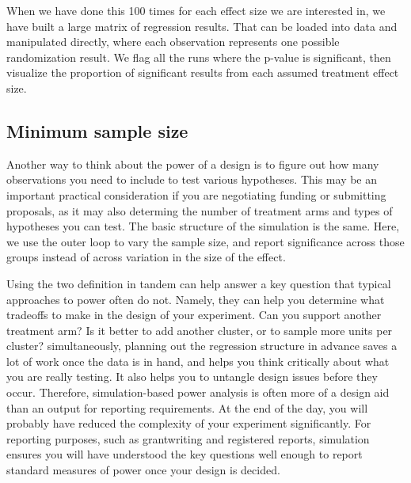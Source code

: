 When we have done this 100 times for each effect size we are interested in,
we have built a large matrix of regression results.
That can be loaded into data and manipulated directly,
where each observation represents one possible randomization result.
We flag all the runs where the p-value is significant,
then visualize the proportion of significant results
from each assumed treatment effect size.

{
}

\subsection{Minimum sample size}

Another way to think about the power of a design
is to figure out how many observations you need to include
to test various hypotheses.
This may be an important practical consideration
if you are negotiating funding or submitting proposals,
as it may also determing the number of treatment arms
and types of hypotheses you can test.
The basic structure of the simulation is the same.
Here, we use the outer loop to vary the sample size,
and report significance across those groups
instead of across variation in the size of the effect.

{
}

Using the two definition in tandem can help answer a key question
that typical approaches to power often do not.
Namely, they can help you determine what tradeoffs to make
in the design of your experiment.
Can you support another treatment arm?
Is it better to add another cluster,
or to sample more units per cluster?
simultaneously, planning out the regression structure
in advance saves a lot of work once the data is in hand,
and helps you think critically about what you are really testing.
It also helps you to untangle design issues before they occur.
Therefore, simulation-based power analysis is often more of a design aid
than an output for reporting requirements.
At the end of the day, you will probably have reduced
the complexity of your experiment significantly.
For reporting purposes, such as grantwriting and registered reports,
simulation ensures you will have understood the key questions well enough
to report standard measures of power once your design is decided.

